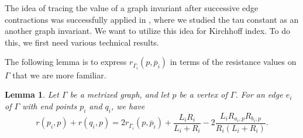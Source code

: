 \documentclass[12pt]{amsart}
\newtheorem{lemma}[theorem]{Lemma}
\theoremstyle{example}
\theoremstyle{definition}
\theoremstyle{notation}
\begin{document}
The idea of tracing the value of a graph invariant after successive edge contractions was successfully applied in \cite{C5}, where we studied the tau constant as an another graph invariant. We want to utilize this idea for Kirchhoff index. To do this, we first need various technical results.

The following lemma is to express $r_{{{\overline{\Gamma}}}_i}(p,{\overline{p}_i})$ in terms of the resistance values on ${\Gamma}$ that we are more familiar.
\begin{lemma}\label{lem res sum}
Let ${\Gamma}$ be a metrized graph, and let $p$ be a vertex of ${\Gamma}$. For an edge $e_i$ of ${\Gamma}$ with end points ${p_{i}}$ and ${q_{i}}$, we have
$$r({p_{i}},p)+r({q_{i}},p)=2r_{{{\overline{\Gamma}}}_i}(p,{\overline{p}_i})+\frac{{L_{i}} {R_{i}}}{{L_{i}}+{R_{i}}}-2\frac{{L_{i}} R_{a_{i},p} R_{b_{i},p}}{{R_{i}}({L_{i}}+{R_{i}})}.$$
\end{lemma}
\end{document}
